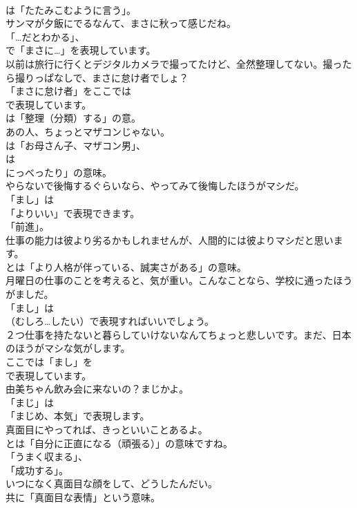 \documentclass[8pt]{extreport}
\begin{document}
\begin{CJK}{UTF8}{min}
\\	は「たたみこむように言う」。	
\\	サンマが夕飯にでるなんて、まさに秋って感じだね。 
\\	「…だとわかる」、
\\	で「まさに…」を表現しています。	
\\	以前は旅行に行くとデジタルカメラで撮ってたけど、全然整理してない。撮ったら撮りっぱなしで、まさに怠け者でしょ？ 
\\	「まさに怠け者」をここでは 
\\	で表現しています。
\\	は「整理（分類）する」の意。	
\\	あの人、ちょっとマザコンじゃない。 
\\	は「お母さん子、マザコン男」、
\\	は
\\	にっべったり」の意味。	
\\	やらないで後悔するぐらいなら、やってみて後悔したほうがマシだ。 
\\	「まし」は
\\	「よりいい」で表現できます。
\\	「前進」。	
\\	仕事の能力は彼より劣るかもしれませんが、人間的には彼よりマシだと思います。 
\\	とは「より人格が伴っている、誠実さがある」の意味。	
\\	月曜日の仕事のことを考えると、気が重い。こんなことなら、学校に通ったほうがましだ。 
\\	「まし」は 
\\	（むしろ…したい）で表現すればいいでしょう。	
\\	２つ仕事を持たないと暮らしていけないなんてちょっと悲しいです。まだ、日本のほうがマシな気がします。 
\\	ここでは「まし」を 
\\	で表現しています。	
\\	由美ちゃん飲み会に来ないの？まじかよ。 
\\	「まじ」は
\\	「まじめ、本気」で表現します。	
\\	真面目にやってれば、きっといいことあるよ。 
\\	とは「自分に正直になる（頑張る）」の意味ですね。
\\	「うまく収まる」、
\\	「成功する」。	
\\	いつになく真面目な顔をして、どうしたんだい。 
\\	共に「真面目な表情」という意味。	

\end{CJK}
\end{document}
